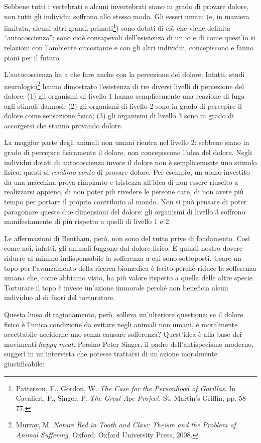 Sebbene tutti i vertebrati e alcuni invertebrati siano in grado di provare dolore, non tutti gli
individui soffrono allo stesso modo. Gli esseri umani (e, in maniera limitata, alcuni altri grandi
primati\footnote{Patterson, F., Gordon, W. \emph{The Case for the Personhood of Gorillas}. In
Cavalieri, P., Singer, P. \emph{The Great Ape Project}. St. Martin's Griffin, pp. 58-77.}) sono
dotati di ciò che viene definita ``autocoscienza''; sono cioè consapevoli dell'esistenza di un io e
di come quest'io si relazioni con l'ambiente circostante e con gli altri individui, concepiscono e
fanno piani per il futuro.

L'autocoscienza ha a che fare anche con la percezione del dolore. Infatti, studi
neurologici\footnote{Murray, M. \emph{Nature Red in Tooth and Claw: Theism and the Problem of Animal
Suffering}. Oxford: Oxford University Press, 2008.} hanno dimostrato l'esistenza di tre diversi
livelli di percezione del dolore: (1) gli organismi di livello 1 hanno semplicemente una reazione di
fuga agli stimoli dannosi; (2) gli organismi di livello 2 sono in grado di percepire il dolore come
sensazione fisica; (3) gli organismi di livello 3 sono in grado di accorgersi che stanno provando
dolore.

La maggior parte degli animali non umani rientra nel livello 2: sebbene siano in grado di percepire
fisicamente il dolore, non concepiscono l'idea del dolore. Negli individui dotati di autocoscienza
invece il dolore non è semplicemente uno stimolo fisico: questi si \emph{rendono conto} di provare
dolore. Per esempio, un uomo investito da una macchina prova rimpianto e tristezza all'idea di non
essere riuscito a realizzarsi appieno, di non poter più rivedere le persone care, di non avere più
tempo per portare il proprio contributo al mondo. Non si può pensare di poter paragonare queste due
dimensioni del dolore: gli organismi di livello 3 soffrono manifestamente di più rispetto a quelli
di livello 1 e 2.

Le affermazioni di Bentham, però, non sono del tutto prive di fondamento. Così come noi, infatti,
gli animali fuggono dal dolore fisico. È quindi nostro dovere ridurre al minimo indispensabile la
sofferenza a cui sono sottoposti. Usare un topo per l'avanzamento della ricerca biomedica è lecito
perché riduce la sofferenza umana che, come abbiamo visto, ha più valore rispetto a quella delle
altre specie. Torturare il topo è invece un'azione immorale perché non beneficia alcun individuo al
di fuori del torturatore.

Questa linea di ragionamento, però, solleva un'ulteriore questione: se il dolore fisico è l'unica
condizione da evitare negli animali non umani, è moralmente accettabile ucciderne uno senza causare
sofferenza? Quest'idea è alla base dei movimenti \emph{happy meat}. Persino Peter Singer, il padre
dell'antispecismo moderno, suggerì in un'intervista che potesse trattarsi di un'azione moralmente
giustificabile:

